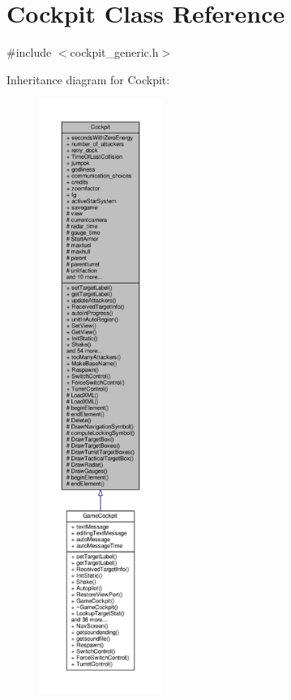 \hypertarget{classCockpit}{}\section{Cockpit Class Reference}
\label{classCockpit}


{\ttfamily \#include $<$cockpit\+\_\+generic.\+h$>$}



Inheritance diagram for Cockpit\+:
\nopagebreak
\begin{figure}[H]
\begin{center}
\leavevmode
\includegraphics[height=550pt]{d9/db0/classCockpit__inherit__graph}
\end{center}
\end{figure}


